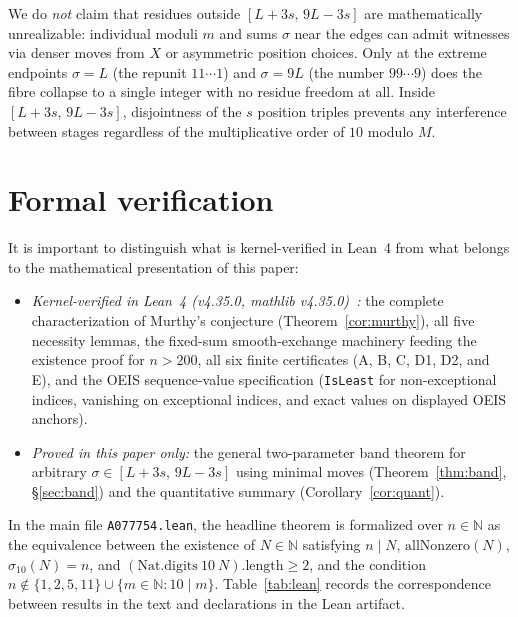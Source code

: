 \documentclass[11pt]{article}
\theoremstyle{remark}
\newcommand{\N}{\mathbb{N}}
\newcommand{\sig}{\sigma}
\begin{document}
We do \emph{not} claim that residues outside $[L+3s,\,9L-3s]$ are
mathematically unrealizable: individual moduli $m$ and sums $\sig$ near the
edges can admit witnesses via denser moves from $X$ or asymmetric position
choices. Only at the extreme endpoints $\sig = L$ (the repunit $11\cdots 1$)
and $\sig = 9L$ (the number $99\cdots 9$) does the fibre collapse to a single
integer with no residue freedom at all. Inside $[L+3s,\,9L-3s]$, disjointness
of the $s$ position triples prevents any interference between stages regardless
of the multiplicative order of $10$ modulo $M$.

\section{Formal verification}
\label{sec:lean}

It is important to distinguish what is kernel-verified in Lean~4 from what
belongs to the mathematical presentation of this paper:
\begin{itemize}
\item \emph{Kernel-verified in Lean~4 (v4.35.0, mathlib v4.35.0)~\cite{lean}:}
the complete characterization of Murthy's conjecture (Theorem~\ref{cor:murthy}),
all five necessity lemmas, the fixed-sum smooth-exchange machinery feeding the
existence proof for $n > 200$, all six finite certificates (A, B, C, D1, D2,
and E), and the OEIS sequence-value specification (\texttt{IsLeast} for
non-exceptional indices, vanishing on exceptional indices, and exact values on
displayed OEIS anchors).
\item \emph{Proved in this paper only:} the general two-parameter band theorem
for arbitrary $\sig \in [L+3s,\,9L-3s]$ using minimal moves
(Theorem~\ref{thm:band}, \S\ref{sec:band}) and the quantitative summary
(Corollary~\ref{cor:quant}).
\end{itemize}

In the main file \texttt{A077754.lean}, the headline theorem is formalized over
$n \in \N$ as the equivalence between the existence of $N \in \N$ satisfying
$n \mid N$, $\mathrm{allNonzero}(N)$, $\sig_{10}(N) = n$, and
$(\mathrm{Nat.digits}\ 10\ N).\mathrm{length} \ge 2$, and the condition
$n \notin \{1,2,5,11\} \cup \{m \in \N : 10 \mid m\}$. Table~\ref{tab:lean}
records the correspondence between results in the text and declarations in the
Lean artifact.
\end{document}
